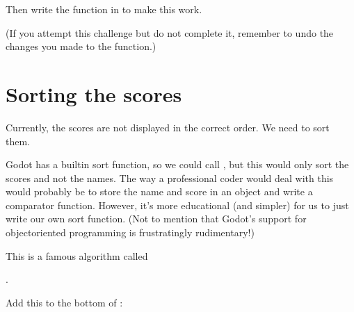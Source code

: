 \documentclass[a4paper,12pt,english]{sphinxmanual}
\begin{document}
\sphinxAtStartPar
Then write the  function in  to make this
work.

\sphinxAtStartPar
(If you attempt this challenge but do not complete it, remember to undo
the changes you made to the  function.)


\section{Sorting the scores}
\label{\detokenize{tutorial:sorting-the-scores}}
\sphinxAtStartPar
Currently, the scores are not displayed in the correct order. We need to
sort them.

\sphinxAtStartPar
Godot has a built\sphinxhyphen{}in sort function, so we could call ,
but this would only sort the scores and not the names. The way a
professional coder would deal with this would probably be to store the
name and score in an object and write a comparator function. However,
it’s more educational (and simpler) for us to just write our own sort
function. (Not to mention that Godot’s support for object\sphinxhyphen{}oriented
programming is frustratingly rudimentary!)

\sphinxAtStartPar
This is a famous algorithm called %
\begin{footnote}[3]\sphinxAtStartFootnote
{}
%
\end{footnote}.

\sphinxAtStartPar
Add this to the bottom of :

\begin{sphinxVerbatim}[commandchars=\\\{\}]
 
       
           
             \PYG{p}{[}\PYG{p}{]}\PYG{p}{[}\PYG{p}{]}
                   \PYG{p}{[}\PYG{p}{]}
                \PYG{p}{[}\PYG{p}{]}  \PYG{p}{[}\PYG{p}{]}
                \PYG{p}{[}\PYG{p}{]}  
                  \PYG{p}{[}\PYG{p}{]}
                \PYG{p}{[}\PYG{p}{]}  \PYG{p}{[}\PYG{p}{]}
                \PYG{p}{[}\PYG{p}{]}  
\end{sphinxVerbatim}
\end{document}
